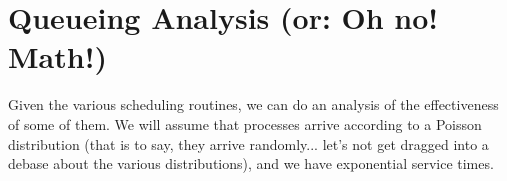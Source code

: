 \section*{Queueing Analysis (or: Oh no! Math!)}
Given the various scheduling routines, we can do an analysis of the effectiveness of some of them. We will assume that processes arrive according to a Poisson distribution (that is to say, they arrive randomly... let's not get dragged into a debase about the various distributions), and we have exponential service times. 








